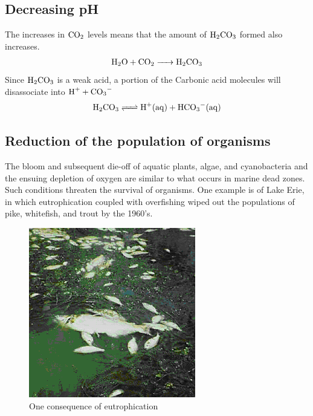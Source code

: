 \documentclass{article}
\begin{document}
    \subsection{Decreasing pH}
    The increases in $\ce{CO2}$ levels means that the amount of $\ce{H2CO3}$ formed also increases. 
    \begin{align}
        \ce{H2O + CO2 -> H2CO3}
    \end{align}
    Since $\ce{H2CO3}$ is a weak acid, a portion of the Carbonic acid molecules will disassociate into $\ce{H+ + CO3-}$
    \begin{align}
        \ce{H2CO3 <=> H+(aq) + HCO3-(aq)}
    \end{align}
    \subsection{Reduction of the population of organisms}
    The bloom and subsequent die-off of aquatic plants, algae, and cyanobacteria and the ensuing depletion of oxygen are similar to what occurs in marine dead zones. 
    Such conditions threaten the survival of organisms. One example is of Lake Erie, in which eutrophication coupled with overfishing wiped out the populations of pike, whitefish, and trout by the 1960's\cite{bio}.
        \begin{figure}[h]
            \centering
            \includegraphics{deadfish}
            \caption{One consequence of eutrophication}
            \label{fig:deadfish}
        \end{figure}
\newpage
\printbibliography[heading=bibintoc]
\end{document}
